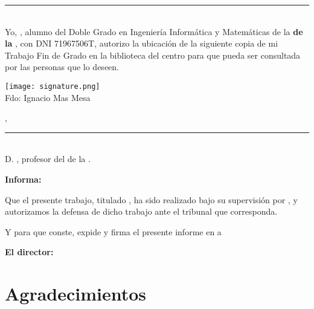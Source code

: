 \documentclass['../proyecto.tex']{memoir}
\begin{document}
\thispagestyle{empty}

\noindent\rule[-1ex]{\textwidth}{2pt}\\[4.5ex]

Yo, \textbf{\AuthorName}, alumno del Doble Grado en
Ingeniería Informática y Matemáticas de la \textbf{\FacultyOne de la
  \University}, con DNI 71967506T, autorizo la ubicación de
la siguiente copia de mi Trabajo Fin de Grado en la biblioteca del
centro para que pueda ser consultada por las personas que lo deseen.

\vspace{6cm}

\texttt{[image: signature.png]} \\
\noindent Fdo: Ignacio Mas Mesa

\vspace{2cm}

\begin{flushright}
  \Location, \Time
\end{flushright}

\newpage

\thispagestyle{empty}

\noindent\rule[-1ex]{\textwidth}{2pt}\\[4.5ex]

D. \textbf{\MainProf}, profesor del
\Department de la \University.

\vspace{0.5cm}

\textbf{Informa:}

\vspace{0.5cm}

Que el presente trabajo, titulado \textit{\textbf{\ProjectTitle}}, ha
sido realizado bajo su supervisión por \textbf{\AuthorName}, y
autorizamos la defensa de dicho trabajo ante el tribunal que
corresponda.

\vspace{0.5cm}

Y para que conste, expide y firma el presente informe en \Location a \Time

\vspace{1cm}

\textbf{El director:}

\vspace{5cm}

\begin{minipage}{0.45\linewidth}
  \begin{center}
    \textbf{\MainProf}
  \end{center}
\end{minipage}

\chapter*{Agradecimientos}
\thispagestyle{empty}

\vspace{1cm}

\newpage
\end{document}
